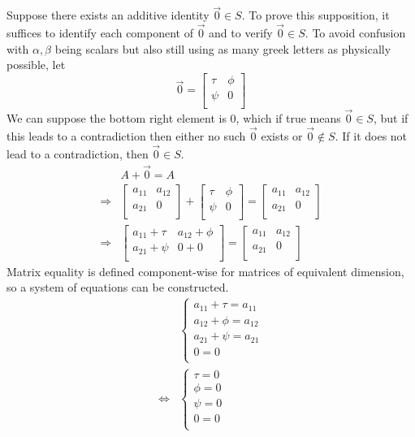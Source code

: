 \documentclass{article}
\begin{document}
Suppose there exists an additive identity \(\vec{0}\in S\). To prove this supposition, it suffices to identify each component of \(\vec{0}\) and to verify \(\vec{0}\in S\). To avoid confusion with \(\alpha ,\beta\) being scalars but also still using as many greek letters as physically possible, let
\[
  \vec{0}=\begin{bmatrix}
    \tau   &\phi     \\
     \psi  &0    \\
  \end{bmatrix}
\]
We can suppose the bottom right element is \(0\), which if true means \(\vec{0}\in S\), but if this leads to a contradiction then either no such \(\vec{0}\) exists or \(\vec{0}\notin S\). If it does not lead to a contradiction, then \(\vec{0}\in S\).
\begin{align*}
  &A+\vec{0}=A\\
\Longrightarrow &\begin{bmatrix}
a_{11}  &a_{12}    \\
 a_{21} &0    \\
\end{bmatrix}+\begin{bmatrix}
  \tau   &\phi     \\
   \psi  &0    \\
\end{bmatrix}=\begin{bmatrix}
  a_{11}  &a_{12}    \\
   a_{21} &0    \\
  \end{bmatrix}\\
  \Longrightarrow &\begin{bmatrix}
    a_{11}+\tau   &a_{12}+\phi     \\
     a_{21}+\psi  &0+0   \\
  \end{bmatrix}=\begin{bmatrix}
    a_{11}  &a_{12}    \\
     a_{21} &0   \\
  \end{bmatrix}
\end{align*}
Matrix equality is defined component-wise for matrices of equivalent dimension, so a system of equations can be constructed.
\begin{align*}
  &\left\{\begin{array}{c}
    a_{11}+\tau =a_{11}\\
    a_{12}+\phi =a_{12}\\
    a_{21}+\psi =a_{21}\\
    0=0\\    
  \end{array}\right.\\
  \Longleftrightarrow &\left\{\begin{array}{c}
    \tau= 0\\
    \phi= 0\\
    \psi =0\\
    0=0\\    
  \end{array}\right.
\end{align*}
\end{document}
